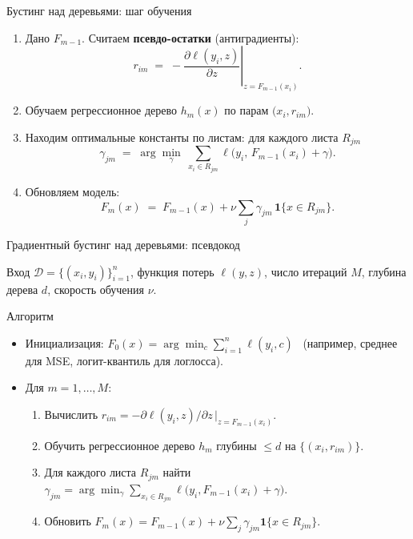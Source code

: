 \documentclass[aspectratio=169]{beamer}
\newcommand{\data}{\mathcal{D}}
\newcommand{\lr}{\nu} %
\begin{document}
\begin{frame}{Бустинг над деревьями: шаг обучения}
	\begin{enumerate}
		\item Дано $F_{m-1}$. Считаем \textbf{псевдо-остатки} (антиградиенты):
		      \[
			      r_{im} \;=\; - \left.\frac{\partial \ell(y_i, z)}{\partial z}\right|_{z=F_{m-1}(x_i)}.
		      \]
		\item Обучаем регрессионное дерево $h_m(x)$ по парам $\big(x_i, r_{im}\big)$.
		\item Находим оптимальные константы по листам: для каждого листа $R_{jm}$
		      \[
			      \gamma_{jm} \;=\; \arg\min_{\gamma}\ \sum_{x_i\in R_{jm}} \ell\!\big(y_i,\, F_{m-1}(x_i)+\gamma\big).
		      \]
		\item Обновляем модель:
		      \[
			      F_m(x) \;=\; F_{m-1}(x) + \lr \sum_{j} \gamma_{jm}\,\mathbf{1}\{x\in R_{jm}\}.
		      \]
	\end{enumerate}
\end{frame}

\begin{frame}{Градиентный бустинг над деревьями: псевдокод}
	\begin{block}{Вход}
		$\data=\{(x_i,y_i)\}_{i=1}^n$, функция потерь $\ell(y, z)$, число итераций $M$, глубина дерева $d$, скорость обучения $\lr$.
	\end{block}
	\begin{block}{Алгоритм}
		\vspace{-1mm}
		\begin{itemize}
			\item Инициализация: $F_0(x) = \arg\min_{c}\sum_{i=1}^n \ell(y_i, c)$ \ (например, среднее для MSE, логит-квантиль для логлосса).
			\item Для $m=1,\dots,M$:
			      \begin{enumerate}
				      \item Вычислить $r_{im}=-\partial \ell(y_i,z)/\partial z\,\big|_{z=F_{m-1}(x_i)}$.
				      \item Обучить регрессионное дерево $h_m$ глубины $\le d$ на $\{(x_i, r_{im})\}$.
				      \item Для каждого листа $R_{jm}$ найти $\gamma_{jm}=\arg\min_{\gamma}\sum_{x_i\in R_{jm}}\ell\!\big(y_i, F_{m-1}(x_i)+\gamma\big)$.
				      \item Обновить $F_m(x)=F_{m-1}(x)+\lr\sum_j \gamma_{jm}\mathbf{1}\{x\in R_{jm}\}$.
			      \end{enumerate}
		\end{itemize}
	\end{block}
\end{frame}
\end{document}
